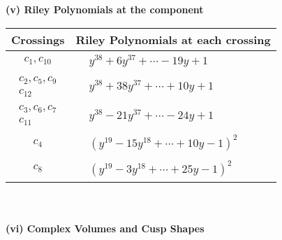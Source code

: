 \documentclass[1p]{elsarticle_modified}
\theoremstyle{definition}
\begin{document}
\flushleft \textbf{(v) Riley Polynomials at the component}\newline \\
\begin{tabular}{m{50pt}|m{274pt}}
Crossings & \hspace{64pt}Riley Polynomials at each crossing \\
\hline $$\begin{aligned}c_{1},c_{10}\end{aligned}$$&$\begin{aligned}
&y^{38}+6 y^{37}+\cdots-19 y+1
\end{aligned}$\\
\hline $$\begin{aligned}c_{2},c_{5},c_{9}\\c_{12}\end{aligned}$$&$\begin{aligned}
&y^{38}+38 y^{37}+\cdots+10 y+1
\end{aligned}$\\
\hline $$\begin{aligned}c_{3},c_{6},c_{7}\\c_{11}\end{aligned}$$&$\begin{aligned}
&y^{38}-21 y^{37}+\cdots-24 y+1
\end{aligned}$\\
\hline $$\begin{aligned}c_{4}\end{aligned}$$&$\begin{aligned}
&(y^{19}-15 y^{18}+\cdots+10 y-1)^{2}
\end{aligned}$\\
\hline $$\begin{aligned}c_{8}\end{aligned}$$&$\begin{aligned}
&(y^{19}-3 y^{18}+\cdots+25 y-1)^{2}
\end{aligned}$\\
\hline
\end{tabular}\\~\\
\newpage\flushleft \textbf{(vi) Complex Volumes and Cusp Shapes}
\end{document}
